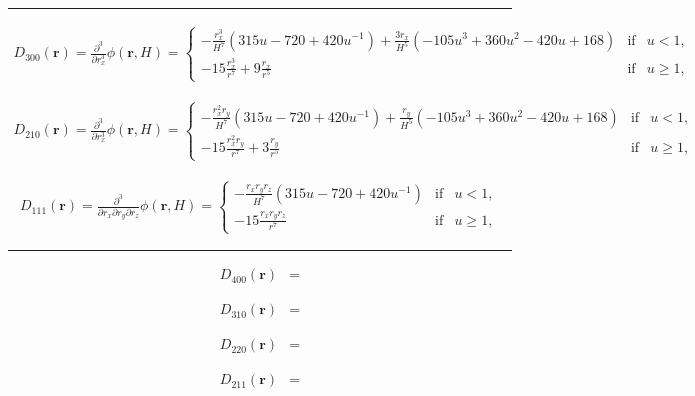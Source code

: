 \noindent\rule{6cm}{0.4pt}

\begin{align}
D_{300}(\mathbf{r}) = \frac{\partial^3}{\partial r_x^3} \phi (\mathbf{r},H) = 
\left\lbrace\begin{array}{rcl}
-\frac{r_x^3}{H^7} \left(315u - 720 + 420u^{-1}\right) +
\frac{3r_x}{H^5}\left(-105u^3+360u^2-420u+168\right) & \mbox{if} & u < 1,\\
-15\frac{r_x^3}{r^7} + 9 \frac{r_x}{r^5} & \mbox{if} & u \geq 1, 
\end{array}
\right.\nonumber
\end{align}

\begin{align}
D_{210}(\mathbf{r}) = \frac{\partial^3}{\partial r_x^3} \phi (\mathbf{r},H) = 
\left\lbrace\begin{array}{rcl}
-\frac{r_x^2r_y}{H^7} \left(315u - 720 + 420u^{-1}\right) +
\frac{r_y}{H^5}\left(-105u^3+360u^2-420u+168\right) & \mbox{if} & u < 1,\\
-15\frac{r_x^2r_y}{r^7} + 3 \frac{r_y}{r^5} & \mbox{if} & u \geq 1, 
\end{array}
\right.\nonumber
\end{align}


\begin{align}
D_{111}(\mathbf{r}) = \frac{\partial^3}{\partial r_x\partial r_y\partial r_z} \phi (\mathbf{r},H) = 
\left\lbrace\begin{array}{rcl}
-\frac{r_xr_yr_z}{H^7} \left(315u - 720 + 420u^{-1}\right) & \mbox{if} & u < 1,\\
-15\frac{r_xr_yr_z}{r^7} & \mbox{if} & u \geq 1, 
\end{array}
\right.\nonumber
\end{align}

\noindent\rule{6cm}{0.4pt}

\begin{align}
  D_{400}(\mathbf{r}) &=
  \nonumber
\end{align}

\begin{align}
  D_{310}(\mathbf{r}) &=
  \nonumber
\end{align}

\begin{align}
  D_{220}(\mathbf{r}) &=
  \nonumber
\end{align}

\begin{align}
  D_{211}(\mathbf{r}) &=
  \nonumber
\end{align}
